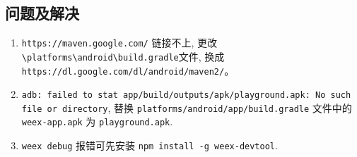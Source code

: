 \subsection{问题及解决}\label{ux95eeux9898ux53caux89e3ux51b3-1}

\begin{enumerate}
\def\labelenumi{\arabic{enumi}.}
\tightlist
\item
  \lstinline!https://maven.google.com/! 链接不上,
  更改\lstinline!\platforms\android\build.gradle!文件, 换成
  \lstinline!https://dl.google.com/dl/android/maven2/!。
\item
  \lstinline!adb: failed to stat app/build/outputs/apk/playground.apk: No such file or directory!,
  替换 \lstinline!platforms/android/app/build.gradle! 文件中的
  \lstinline!weex-app.apk! 为 \lstinline!playground.apk!.
\item
  \lstinline!weex debug! 报错可先安装
  \lstinline!npm install -g weex-devtool!.
\end{enumerate}
